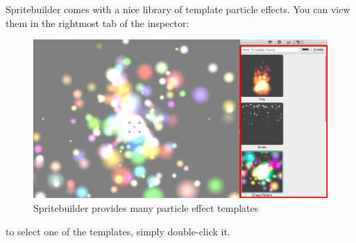 Spritebuilder comes with a nice library of template particle effects. You can
view them in the rightmost tab of the inspector:
\begin{figure}[H]
		\centering
		\includegraphics[width=375pt]{images/particles/Spritebuilder_ParticleEffect_Templates.png}   
		\caption{Spritebuilder provides many particle effect templates}
\end{figure}
to select one of the templates, simply double-click it.
